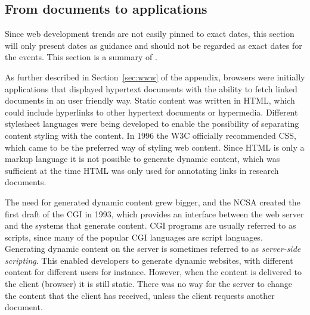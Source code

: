 \documentclass[a4paper,11pt]{kth-mag}
\begin{document}
      \subsection{From documents to applications}\label{sec:doc-to-app}
        Since \gls{web} development trends are not easily pinned to exact dates, this section will only present dates as guidance and should not be regarded as exact dates for the events.
        This section is a summary of .

        As further described in Section~\ref{sec:www} of the appendix, \glspl{browser} were initially applications that displayed \gls{hypertext} \glspl{document} with the ability to fetch linked \glspl{document} in an user friendly way.
        Static content was written in \gls{HTML}, which could include hyperlinks to other \gls{hypertext} \glspl{document} or hypermedia.
        Different stylesheet languages were being developed to enable the possibility of separating content styling with the content.
        In 1996 the \gls{W3C} officially recommended \gls{CSS}, which came to be the preferred way of styling \gls{web} content.
        Since \gls{HTML} is only a markup language it is not possible to generate dynamic content, which was sufficient at the time \gls{HTML} was only used for annotating links in research \glspl{document}.

        The need for generated dynamic content grew bigger, and the \gls{NCSA} created the first draft of the \gls{CGI} in 1993, which provides an interface between the \gls{web} server and the systems that generate content.
        \gls{CGI} programs are usually referred to as scripts, since many of the popular \gls{CGI} languages are script languages.
        Generating dynamic content on the server is sometimes referred to as \emph{server-side scripting}.
        This enabled developers to generate dynamic websites, with different content for different users for instance.
        However, when the content is delivered to the client (\gls{browser}) it is still static.
        There was no way for the server to change the content that the client has received, unless the client requests another \gls{document}.
\end{document}
